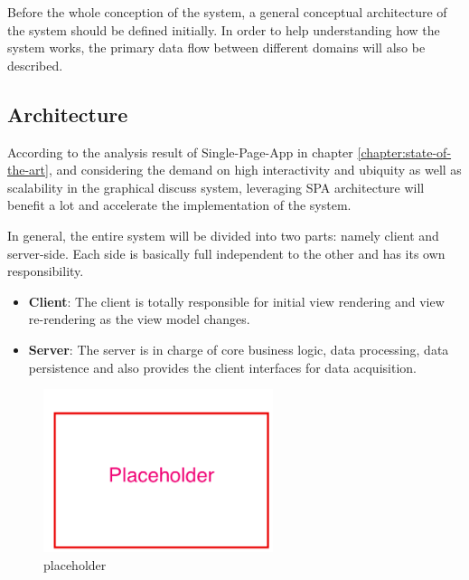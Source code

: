 Before the whole conception of the system, a general conceptual architecture of the system should be defined initially. In order to help understanding how the system works, the primary data flow between different domains will also be described.

\subsection{Architecture} \label{sec:concept-general-architecture}
According to the analysis result of Single-Page-App in chapter \ref{chapter:state-of-the-art}, and considering the demand on high interactivity and ubiquity as well as scalability in the graphical discuss system, leveraging SPA architecture will benefit a lot and accelerate the implementation of the system. 

In general, the entire system will be divided into two parts: namely client and server-side. Each side is basically full independent to the other and has its own responsibility. 

\begin{itemize}
\item
\textbf{Client}: The client is totally responsible for initial view rendering and view re-rendering as the view model changes. 
\item
\textbf{Server}: The server is in charge of core business logic, data processing, data persistence and also provides the client interfaces for data acquisition.
\end{itemize}

\begin{figure}[!htbp]
  \centering
    \includegraphics[width=0.6\textwidth]{Figures/placeholder.png}
  \caption{placeholder}
  \label{fig:general-architecture-concept}
\end{figure}


